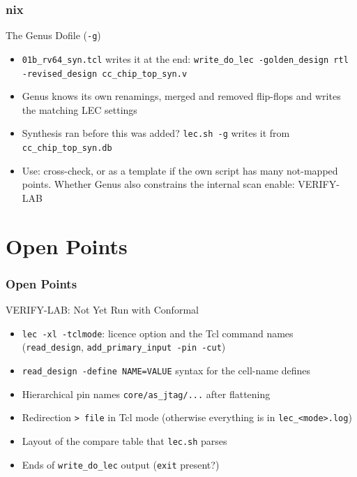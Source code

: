 \documentclass{beamer}
\newcommand{\astitle}{nix}
\newcommand{\assubtitle}{nix}
\newcommand{\cmd}[1]{\texttt{#1}}
\begin{document}
\renewcommand{\assubtitle}{The Genus Dofile (\texttt{-g})}
\begin{frame}
\frametitle{\astitle}
\begin{block}{\assubtitle}
  \begin{itemize}
    \item \cmd{01b\_rv64\_syn.tcl} writes it at the end:
      \cmd{write\_do\_lec -golden\_design rtl -revised\_design
      cc\_chip\_top\_syn.v}
    \item Genus knows its own renamings, merged and removed flip-flops
      and writes the matching LEC settings
    \item Synthesis ran before this was added? \cmd{lec.sh -g} writes it
      from \cmd{cc\_chip\_top\_syn.db}
    \item Use: cross-check, or as a template if the own script has many
      not-mapped points. Whether Genus also constrains the internal scan
      enable: VERIFY-LAB
  \end{itemize}
\end{block}
\end{frame}

\section{Open Points}
\renewcommand{\astitle}{Open Points}

\renewcommand{\assubtitle}{VERIFY-LAB: Not Yet Run with Conformal}
\begin{frame}
\frametitle{\astitle}
\begin{block}{\assubtitle}
  \begin{itemize}
    \item \cmd{lec -xl -tclmode}: licence option and the Tcl command
      names (\cmd{read\_design}, \cmd{add\_primary\_input -pin -cut})
    \item \cmd{read\_design -define NAME=VALUE} syntax for the cell-name
      defines
    \item Hierarchical pin names \cmd{core/as\_jtag/...} after flattening
    \item Redirection \cmd{> file} in Tcl mode (otherwise everything is in
      \cmd{lec\_<mode>.log})
    \item Layout of the compare table that \cmd{lec.sh} parses
    \item Ends of \cmd{write\_do\_lec} output (\cmd{exit} present?)
  \end{itemize}
\end{block}
\end{frame}
\end{document}
